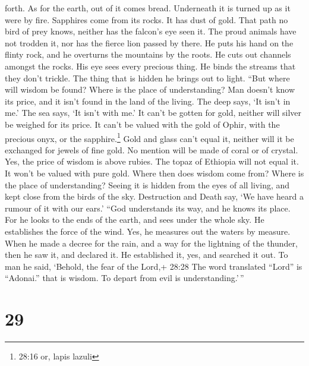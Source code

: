 forth.  As for the earth, out of it comes bread. Underneath
it is turned up as it were by fire.  Sapphires come from its
rocks. It has dust of gold.  That path no bird of prey
knows, neither has the falcon's eye seen it.  The proud
animals have not trodden it, nor has the fierce lion passed by there.
 He puts his hand on the flinty rock, and he overturns the
mountains by the roots.  He cuts out channels amongst the
rocks. His eye sees every precious thing.  He binds the
streams that they don't trickle. The thing that is hidden he brings out
to light.  ``But where will wisdom be found? Where is the
place of understanding?  Man doesn't know its price, and it
isn't found in the land of the living.  The deep says, `It
isn't in me.' The sea says, `It isn't with me.'  It can't
be gotten for gold, neither will silver be weighed for its price.
 It can't be valued with the gold of Ophir, with the
precious onyx, or the sapphire.\footnote{28:16 or, lapis lazuli}
 Gold and glass can't equal it, neither will it be
exchanged for jewels of fine gold.  No mention will be made
of coral or of crystal. Yes, the price of wisdom is above rubies.
 The topaz of Ethiopia will not equal it. It won't be
valued with pure gold.  Where then does wisdom come from?
Where is the place of understanding?  Seeing it is hidden
from the eyes of all living, and kept close from the birds of the sky.
 Destruction and Death say, `We have heard a rumour of it
with our ears.'  ``God understands its way, and he knows
its place.  For he looks to the ends of the earth, and sees
under the whole sky.  He establishes the force of the wind.
Yes, he measures out the waters by measure.  When he made a
decree for the rain, and a way for the lightning of the thunder,
 then he saw it, and declared it. He established it, yes,
and searched it out.  To man he said, `Behold, the fear of
the Lord,+ 28:28 The word translated ``Lord'' is ``Adonai.'' that is
wisdom. To depart from evil is understanding.'\,''

\hypertarget{section-21}{%
\section{29}\label{section-21}}

